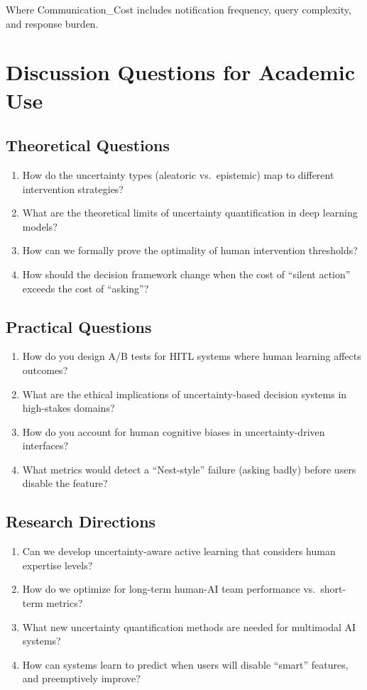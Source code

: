 Where Communication\_Cost includes notification frequency, query complexity, and response burden.

\section{Discussion Questions for Academic Use}

\subsection{Theoretical Questions}
\begin{enumerate}
    \item How do the uncertainty types (aleatoric vs.\ epistemic) map to different intervention strategies?
    \item What are the theoretical limits of uncertainty quantification in deep learning models?
    \item How can we formally prove the optimality of human intervention thresholds?
    \item How should the decision framework change when the cost of ``silent action'' exceeds the cost of ``asking''?
\end{enumerate}

\subsection{Practical Questions}
\begin{enumerate}
    \item How do you design A/B tests for HITL systems where human learning affects outcomes?
    \item What are the ethical implications of uncertainty-based decision systems in high-stakes domains?
    \item How do you account for human cognitive biases in uncertainty-driven interfaces?
    \item What metrics would detect a ``Nest-style'' failure (asking badly) before users disable the feature?
\end{enumerate}

\subsection{Research Directions}
\begin{enumerate}
    \item Can we develop uncertainty-aware active learning that considers human expertise levels?
    \item How do we optimize for long-term human-AI team performance vs.\ short-term metrics?
    \item What new uncertainty quantification methods are needed for multimodal AI systems?
    \item How can systems learn to predict when users will disable ``smart'' features, and preemptively improve?
\end{enumerate}

